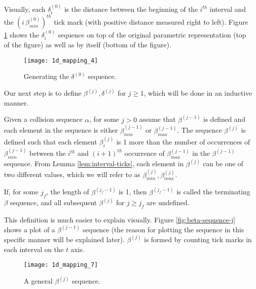 Visually, each $\delta^{(0)}_i$ is the distance between the beginning of the $i^{th}$ interval and the $(i \, \beta^{(0)}_{min})^{th}$ tick mark (with positive distance measured right to left). Figure \ref{fig:delta-sequence} shows the $\delta^{(0)}_i$ sequence on top of the original parametric representation (top of the figure) as well as by itself (bottom of the figure).

\begin{figure}[H]
  \begin{center}
    \texttt{[image: 1d\_mapping\_4]}
  \end{center}
  \vspace{-.2in} %
  \caption{\label{fig:delta-sequence} Generating the $\delta^{(0)}$ sequence.}
\end{figure}

Our next step is to define $\beta^{(j)}, \delta^{(j)}$ for $j \ge 1$, which will be done in an inductive manner. 

\begin{definition}
  \label{def:beta-definition}
  Given a collision sequence $\alpha$, for some $j > 0$ assume that $\beta^{(j-1)}$ is defined and each element in the sequence is either $\beta^{(j-1)}_{min}$ or $\beta^{(j-1)}_{max}$. The sequence $\beta^{(j)}$ is defined such that each element $\beta^{(j)}_i$ is 1 more than the number of occurrences of $\beta^{(j-1)}_{min}$ between the $i^{th}$ and $(i+1)^{th}$ occurrence of $\beta^{(j-1)}_{max}$ in the $\beta^{(j-1)}$ sequence. From Lemma \ref{lem:interval-ticks}, each element in $\beta^{(j)}$ can be one of two different values, which we will refer to as $\beta^{(j)}_{min}, \beta^{(j)}_{max}$.

  If, for some $j_f$, the length of $\beta^{(j_f-1)}$ is 1, then $\beta^{(j_f-1)}$ is called the terminating $\beta$ sequence, and all subsequent $\beta^{(j)}$ for $j \ge j_f$ are undefined.
\end{definition}

This definition is much easier to explain visually. Figure \ref{fig:beta-sequence-j} shows a plot of a $\beta^{(j-1)}$ sequence (the reason for plotting the sequence in this specific manner will be explained later). $\beta^{(j)}$ is formed by counting tick marks in each interval on the $t$ axis.

\begin{figure}[H]
  \begin{center}
    \texttt{[image: 1d\_mapping\_7]}
  \end{center}
  \vspace{-.2in} %
  \caption{\label{beta-sequence-j} A general $\beta^{(j)}$ sequence.}
\end{figure}

